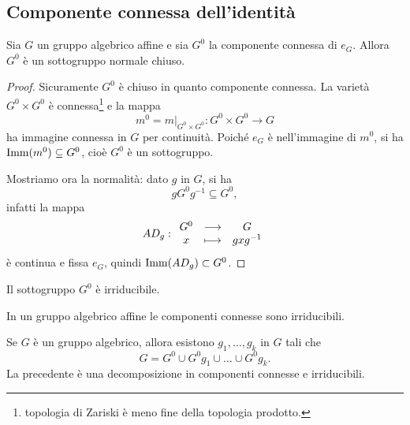 \subsection{Componente connessa dell'identit\`a}
\begin{proposition}
    Sia $G$ un gruppo algebrico affine e sia $G^0$ la componente connessa di $e_G$. Allora $G^0$ è un sottogruppo normale chiuso.
\end{proposition}
\begin{proof}
    Sicuramente $G^0$ è chiuso in quanto componente connessa. La variet\`a $G^0\times G^0$ è connessa\footnote{topologia di Zariski \`e meno fine della topologia prodotto.} e la mappa \[ m^0=\left.m\right|_{G^0\times G^0}\colon G^0\times G^0 \longrightarrow G\] ha immagine connessa in $G$ per continuit\`a. Poiché $e_G$ è nell'immagine di $m^0$, si ha $\operatorname{Imm}(m^0)\subseteq G^0$, cio\`e $G^0$ \`e un sottogruppo. 
    \medskip
    
    \noindent
    Mostriamo ora la normalit\`a: dato $g$ in $G$, si ha \[gG^0g^{-1}\subseteq G^0,\]
    infatti la mappa
    \[AD_g:\begin{array}{ccc} {G^0} & \longrightarrow & {G}\\ {x} & \longmapsto & {gxg^{-1}} \end{array}\]
    \`e continua e fissa $e_G$, quindi $\operatorname{Imm}(AD_g)\subset G^0$.
\end{proof}

\begin{exercise}
    Il sottogruppo $G^0$ è irriducibile.
\end{exercise}

\begin{remark}\label{ReInGruppoComponentiConnesseSonoIrriducibili}
In un gruppo algebrico affine le componenti connesse sono irriducibili.
\end{remark}


\begin{remark}\label{RmDecomposizioneG0}
    Se $G$ è un gruppo algebrico, allora esistono $g_1,\ldots,g_k$ in $G$ tali che \[G=G^0 \cup G^0 g_1 \cup \ldots\cup G^0g_k.\]
    La precedente è una decomposizione in componenti connesse e irriducibili.
\end{remark}

